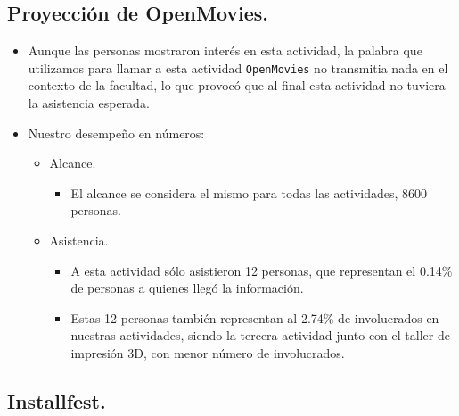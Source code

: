 \documentclass[a4paper,11pt]{article}                 %
\begin{document}
  \subsection{Proyección de OpenMovies.} 
  
  \begin{itemize}
    \item Aunque las personas mostraron interés en esta actividad, la palabra que utilizamos para llamar a esta actividad \texttt{OpenMovies} no transmitia nada en el contexto de la facultad, lo que provocó que al final esta actividad no tuviera la asistencia esperada.
    
    \item Nuestro desempeño en números:
    
    \begin{itemize}
    \item Alcance.
    \begin{itemize}
      \item El alcance se considera el mismo para todas las actividades, 8600 personas.
    \end{itemize}

    \item Asistencia.
    \begin{itemize}
      \item A esta actividad sólo asistieron 12 personas, que representan el 0.14\% de personas a quienes llegó la información.
      \item Estas 12 personas también representan al 2.74\% de involucrados en nuestras actividades, siendo la tercera actividad junto con el taller de impresión 3D, con menor número de involucrados. 
    \end{itemize}
    \end{itemize} 
    
  \end{itemize}
  
  
  \subsection{Installfest.}  
  
\end{document}
